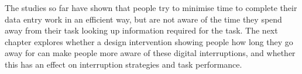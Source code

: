 
The studies so far have shown that people try to minimise time to complete their data entry work in an efficient way, but are not aware of the time they spend away from their task looking up information required for the task. The next chapter explores whether a design intervention showing people how long they go away for can make people more aware of these digital interruptions, and whether this has an effect on interruption strategies and task performance.